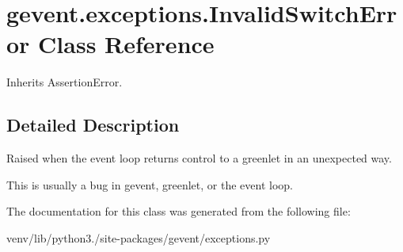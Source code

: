 \hypertarget{classgevent_1_1exceptions_1_1_invalid_switch_error}{}\section{gevent.\+exceptions.\+Invalid\+Switch\+Error Class Reference}
\label{classgevent_1_1exceptions_1_1_invalid_switch_error}


Inherits Assertion\+Error.



\subsection{Detailed Description}
\begin{DoxyVerb}Raised when the event loop returns control to a greenlet in an
unexpected way.

This is usually a bug in gevent, greenlet, or the event loop.
\end{DoxyVerb}
 

The documentation for this class was generated from the following file\+:\begin{DoxyCompactItemize}
\item 
venv/lib/python3./site-\/packages/gevent/exceptions.\+py\end{DoxyCompactItemize}
